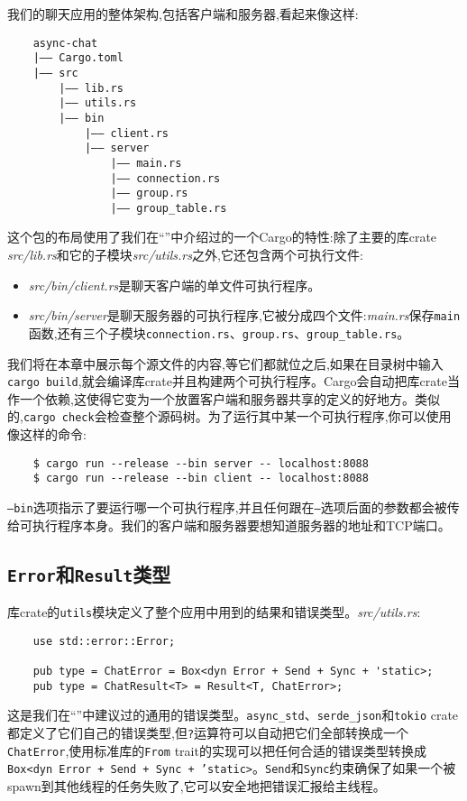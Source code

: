 我们的聊天应用的整体架构,包括客户端和服务器,看起来像这样:
\begin{verbatim}
    async-chat
    |—— Cargo.toml
    |—— src
        |—— lib.rs
        |—— utils.rs
        |—— bin
            |—— client.rs
            |—— server
                |—— main.rs
                |—— connection.rs
                |—— group.rs
                |—— group_table.rs
\end{verbatim}

这个包的布局使用了我们在“”中介绍过的一个Cargo的特性:除了主要的库crate \emph{src/lib.rs}和它的子模块\emph{src/utils.rs}之外,它还包含两个可执行文件:
\begin{itemize}
    \item \emph{src/bin/client.rs}是聊天客户端的单文件可执行程序。
    \item \emph{src/bin/server}是聊天服务器的可执行程序,它被分成四个文件:\emph{main.rs}保存\texttt{main}函数,还有三个子模块\texttt{connection.rs}、\texttt{group.rs}、\texttt{group\_table.rs}。
\end{itemize}

我们将在本章中展示每个源文件的内容,等它们都就位之后,如果在目录树中输入\texttt{cargo build},就会编译库crate并且构建两个可执行程序。Cargo会自动把库crate当作一个依赖,这使得它变为一个放置客户端和服务器共享的定义的好地方。类似的,\texttt{cargo check}会检查整个源码树。为了运行其中某一个可执行程序,你可以使用像这样的命令:
\begin{verbatim}
    $ cargo run --release --bin server -- localhost:8088
    $ cargo run --release --bin client -- localhost:8088
\end{verbatim}

\texttt{--bin}选项指示了要运行哪一个可执行程序,并且任何跟在\texttt{--}选项后面的参数都会被传给可执行程序本身。我们的客户端和服务器要想知道服务器的地址和TCP端口。

\subsection{\texttt{Error}和\texttt{Result}类型}
库crate的\texttt{utils}模块定义了整个应用中用到的结果和错误类型。\emph{src/utils.rs}:
\begin{verbatim}
    use std::error::Error;

    pub type = ChatError = Box<dyn Error + Send + Sync + 'static>;
    pub type = ChatResult<T> = Result<T, ChatError>;
\end{verbatim}

这是我们在“”中建议过的通用的错误类型。\texttt{async\_std}、\texttt{serde\_json}和\texttt{tokio} crate都定义了它们自己的错误类型,但\texttt{?}运算符可以自动把它们全部转换成一个\texttt{ChatError},使用标准库的\texttt{From} trait的实现可以把任何合适的错误类型转换成\texttt{Box<dyn Error + Send + Sync + 'static>}。\texttt{Send}和\texttt{Sync}约束确保了如果一个被spawn到其他线程的任务失败了,它可以安全地把错误汇报给主线程。

